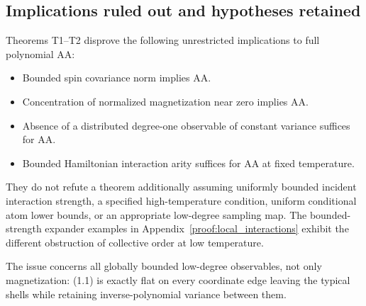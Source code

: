 \subsection{Implications ruled out and hypotheses
retained}\label{proof:thin_shell_obstruction:implications-ruled-out-and-hypotheses-retained}

Theorems T1--T2 disprove the following unrestricted implications to full
polynomial AA:

\begin{itemize}
\tightlist
\item
  Bounded spin covariance norm implies AA.
\item
  Concentration of normalized magnetization near zero implies AA.
\item
  Absence of a distributed degree-one observable of constant variance
  suffices for AA.
\item
  Bounded Hamiltonian interaction arity suffices for AA at fixed
  temperature.
\end{itemize}

They do not refute a theorem additionally assuming uniformly bounded
incident interaction strength, a specified high-temperature condition,
uniform conditional atom lower bounds, or an appropriate low-degree
sampling map. The bounded-strength expander examples in
Appendix~\ref{proof:local_interactions} exhibit the different obstruction of
collective order at low temperature.

The issue concerns all globally bounded low-degree observables, not only
magnetization: (1.1) is exactly flat on every coordinate edge leaving
the typical shells while retaining inverse-polynomial variance between
them.

